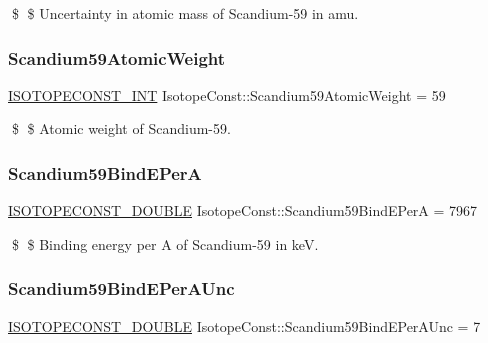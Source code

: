 \$ \$ Uncertainty in atomic mass of Scandium-\/59 in amu. \mbox{\label{group___isotope_const-_scandium-_sc59_ga44cf9dcc5e543c371bdda03eb4d0d286}} 
\subsubsection{\texorpdfstring{Scandium59\+Atomic\+Weight}{Scandium59AtomicWeight}}
{\footnotesize\ttfamily \mbox{\hyperlink{group___isotope_const-_macros_ga5f18360b3e99483a35c32d789e62621c}{I\+S\+O\+T\+O\+P\+E\+C\+O\+N\+S\+T\+\_\+\+I\+NT}} Isotope\+Const\+::\+Scandium59\+Atomic\+Weight = 59}

\$ \$ Atomic weight of Scandium-\/59. \mbox{\label{group___isotope_const-_scandium-_sc59_gad63a1afe8b1392f1946108490ac77b1c}} 
\subsubsection{\texorpdfstring{Scandium59\+Bind\+E\+PerA}{Scandium59BindEPerA}}
{\footnotesize\ttfamily \mbox{\hyperlink{group___isotope_const-_macros_ga8f45a7272ce02c0b4c65c44636ed719a}{I\+S\+O\+T\+O\+P\+E\+C\+O\+N\+S\+T\+\_\+\+D\+O\+U\+B\+LE}} Isotope\+Const\+::\+Scandium59\+Bind\+E\+PerA = 7967}

\$ \$ Binding energy per A of Scandium-\/59 in keV. \mbox{\label{group___isotope_const-_scandium-_sc59_ga80df70959d138b89244425301f19c00b}} 
\subsubsection{\texorpdfstring{Scandium59\+Bind\+E\+Per\+A\+Unc}{Scandium59BindEPerAUnc}}
{\footnotesize\ttfamily \mbox{\hyperlink{group___isotope_const-_macros_ga8f45a7272ce02c0b4c65c44636ed719a}{I\+S\+O\+T\+O\+P\+E\+C\+O\+N\+S\+T\+\_\+\+D\+O\+U\+B\+LE}} Isotope\+Const\+::\+Scandium59\+Bind\+E\+Per\+A\+Unc = 7}

